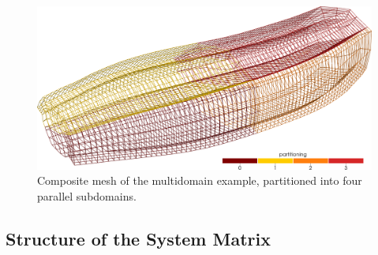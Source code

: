 % 
\begin{figure}
  \centering%
  \includegraphics[width=\textwidth]{images/implementation/multidomain_matrix_mesh.png}%
  \caption{Composite mesh of the multidomain example, partitioned into four parallel subdomains.}%
  \label{fig:multidomain_matrix_mesh}%
\end{figure}%

\subsection{Structure of the System Matrix}\label{sec:structure_multidomain_system_matrix}

